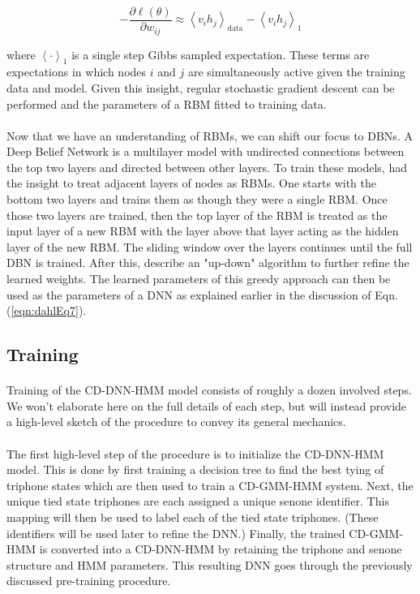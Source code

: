 \documentclass[letterpaper]{article}
\newcommand{\partialDx}[2]{\frac{\partial #1}{ \partial #2  }}
\newcommand{\inAngle}[1]{\left \langle #1 \right \rangle}
\newcommand{\DBN}{Deep Belief Network\xspace}
\begin{document}
\begin{equation}
	- \partialDx{\ell(\theta)}{w_{ij}} \approx \inAngle{ v_i h_j }_\text{data} - \inAngle{ v_i h_j }_\text{1}
\end{equation}

where $\inAngle{ \cdot }_\text{1}$ is a single step Gibbs sampled expectation. These terms are expectations in which nodes $i$ and $j$ are simultaneously active given the training data and model. Given this insight, regular stochastic gradient descent can be performed and the parameters of a RBM fitted to training data.

\paragraph{} Now that we have an understanding of RBMs, we can shift our focus to DBNs. A \DBN is a multilayer model with undirected connections between the top two layers and directed between other layers. To train these models, \cite{DBLP:journals/neco/HintonOT06} had the insight to treat adjacent layers of nodes as RBMs. One starts with the bottom two layers and trains them as though they were a single RBM. Once those two layers are trained, then the top layer of the RBM is treated as the input layer of a new RBM with the layer above that layer acting as the hidden layer of the new RBM. The sliding window over the layers continues until the full DBN is trained.  After this, \cite{DBLP:journals/neco/HintonOT06} describe an "up-down" algorithm to further refine the learned weights. The learned parameters of this greedy approach can then be used as the parameters of a DNN as explained earlier in the discussion of Eqn. (\ref{eqn:dahlEq7}).

\subsection*{Training}

\paragraph{} Training of the CD-DNN-HMM model consists of roughly a dozen involved steps. We won't elaborate here on the full details of each step, but will instead provide a high-level sketch of the procedure to convey its general mechanics. 

\paragraph{} The first high-level step of the procedure is to initialize the CD-DNN-HMM model. This is done by first training a decision tree to find the best tying of triphone states which are then used to train a CD-GMM-HMM system. Next, the unique tied state triphones are each assigned a unique senone identifier. This mapping will then be used to label each of the tied state triphones. (These identifiers will be used later to refine the DNN.) Finally, the trained CD-GMM-HMM is converted into a CD-DNN-HMM by retaining the triphone and senone structure and HMM parameters. This resulting DNN goes through the previously discussed pre-training procedure.
\end{document}
